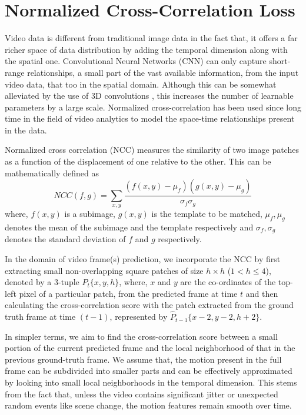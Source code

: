 \documentclass{article}
\begin{document}
\section{Normalized Cross-Correlation Loss}
  \label{sec:nccl}
  Video data is different from traditional image data in the fact that, it offers a far richer space of data distribution by adding the temporal dimension along with the spatial one. Convolutional Neural Networks (CNN) can only capture short-range relationships, a small part of the vast available information, from the input video data, that too in the spatial domain. Although this can be somewhat alleviated by the use of 3D convolutions \cite{ji20133d}, this increases the number of learnable parameters by a large scale. Normalized cross-correlation has been used since long time in the field of video analytics \cite{briechle2001template, nakhmani2013new, luo2010fast} to model the space-time relationships present in the data.
  
  Normalized cross correlation (NCC) measures the similarity of two image patches as a function of the displacement of one relative to the other. This can be mathematically defined as
  \begin{equation}
  	NCC(f, g) = \sum_{x, y}^{}\frac{(f(x, y) - \mu_f)(g(x, y) - \mu_g)}{\sigma_f \sigma_g}
  	\label{eq:ncc}
  \end{equation}
  where, $ f(x, y) $ is a subimage, $ g(x, y) $ is the template to be matched, $ \mu_f, \mu_g $ denotes the mean of the subimage and the template respectively and $ \sigma_f, \sigma_g $ denotes the standard deviation of $ f $ and $ g $ respectively.
  
  In the domain of video frame(s) prediction, we incorporate the NCC by first extracting small non-overlapping square patches of size $ h \times h $ ($ 1 < h \leq 4 $), denoted by a 3-tuple $ P_t\{x, y, h\} $, where, $ x $ and $ y $ are the co-ordinates of the top-left pixel of a particular patch, from the predicted frame at time $ t $ and then calculating the cross-correlation score with the patch extracted from the ground truth frame at time $ (t-1) $, represented by $ \hat{P}_{t-1}\{x-2, y-2, h+2\} $. 
  
  In simpler terms, we aim to find the cross-correlation score between a small portion of the current predicted frame and the local neighborhood of that in the previous ground-truth frame. We assume that, the motion present in the full frame can be subdivided into smaller parts and can be effectively approximated by looking into small local neighborhoods in the temporal dimension. This stems from the fact that, unless the video contains significant jitter or unexpected random events like scene change, the motion features remain smooth over time. 
  
\end{document}
